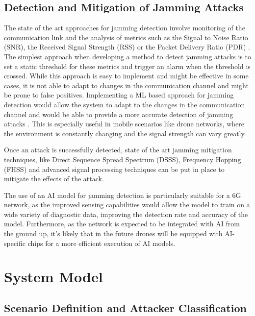 \documentclass[futureinternet,article,submit,pdftex,moreauthors]{Definitions/mdpi}
\begin{document}
\subsection{Detection and Mitigation of Jamming Attacks}\label{sec:DetectionMitigation}

The state of the art approaches for jamming detection involve monitoring of the communication link and the analysis of metrics such as the Signal to Noise Ratio (SNR), the Received Signal Strength (RSS) or the Packet Delivery Ratio (PDR) \cite{JammingDetection-Sciancalepore}. The simplest approach when 
developing a method to detect jamming attacks is to set a static threshold for these metrics and trigger an alarm when the threshold is crossed. While this approach is easy to implement and might be effective in some cases, it is not able to adapt to changes in the communication channel and might be prone to false positives.
Implementing a ML based approach for jamming detection would allow the system to adapt to the changes in the communication channel and would be able to provide a more accurate detection of jamming attacks \cite{VANETsAI-Lyamin}. This is especially useful in mobile scenarios like 
drone networks, where the environment is constantly changing and the signal strength can vary greatly. 

Once an attack is successfully detected, state of the art jamming mitigation techniques, like Direct Sequence Spread Spectrum (DSSS), Frequency Hopping (FHSS) and advanced signal processing techniques can be put in place to mitigate the 
effects of the attack. 

The use of an AI model for jamming detection is particularly suitable for a 6G network, as the improved sensing capabilities would allow the model to train on a wide variety of diagnostic data, improving the detection rate and accuracy of the model. 
Furthermore, as the network is expected to be integrated with AI from the ground up, it's likely that in the future drones will be equipped with AI-specific chips for a more efficient execution of AI models.

\section{System Model}

\subsection{Scenario Definition and Attacker Classification}
\end{document}
